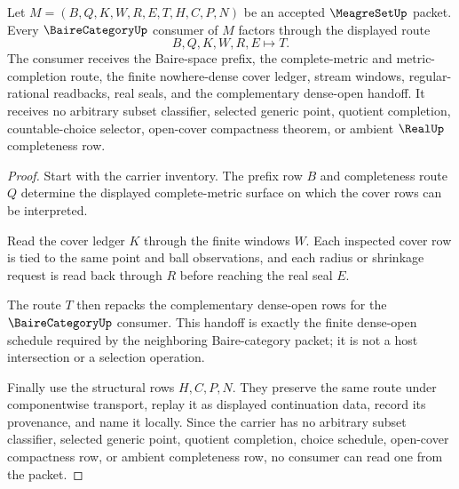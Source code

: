 \begin{theorem}\label{thm:meagre-set-bairecategory-consumer-route}
Let $M=(B,Q,K,W,R,E,T,H,C,P,N)$ be an accepted $\MeagreSetUp$ packet. Every $\BaireCategoryUp$ consumer of $M$ factors through the displayed route
$$
B,Q,K,W,R,E \longmapsto T .
$$
The consumer receives the Baire-space prefix, the complete-metric and metric-completion route, the finite nowhere-dense cover ledger, stream windows, regular-rational readbacks, real seals, and the complementary dense-open handoff. It receives no arbitrary subset classifier, selected generic point, quotient completion, countable-choice selector, open-cover compactness theorem, or ambient $\RealUp$ completeness row.
\end{theorem}
\begin{proof}
Start with the carrier inventory. The prefix row $B$ and completeness route $Q$ determine the displayed complete-metric surface on which the cover rows can be interpreted.

Read the cover ledger $K$ through the finite windows $W$. Each inspected cover row is tied to the same point and ball observations, and each radius or shrinkage request is read back through $R$ before reaching the real seal $E$.

The route $T$ then repacks the complementary dense-open rows for the $\BaireCategoryUp$ consumer. This handoff is exactly the finite dense-open schedule required by the neighboring Baire-category packet; it is not a host intersection or a selection operation.

Finally use the structural rows $H,C,P,N$. They preserve the same route under componentwise transport, replay it as displayed continuation data, record its provenance, and name it locally. Since the carrier has no arbitrary subset classifier, selected generic point, quotient completion, choice schedule, open-cover compactness row, or ambient completeness row, no consumer can read one from the packet.
\end{proof}

